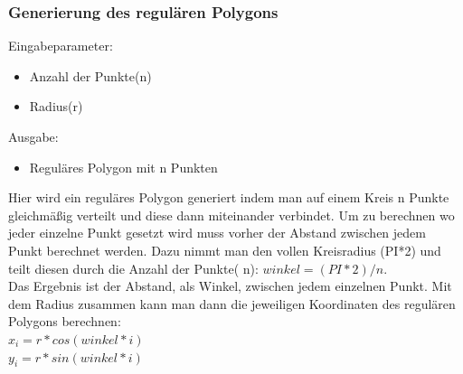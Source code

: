   \subsubsection{Generierung des regulären Polygons}
    Eingabeparameter: 
    \begin{itemize}
      \item Anzahl der Punkte(n)
      \item Radius(r)
    \end{itemize}
    Ausgabe:
    \begin{itemize} 
      \item Reguläres Polygon mit n Punkten
    \end{itemize}
    Hier wird ein reguläres Polygon generiert indem man auf einem Kreis n 
    Punkte gleichmäßig verteilt und diese dann miteinander verbindet. Um 
    zu berechnen wo jeder einzelne Punkt gesetzt wird muss vorher der 
    Abstand zwischen jedem Punkt berechnet werden. Dazu nimmt man den 
    vollen Kreisradius (PI*2) und teilt diesen durch die Anzahl der Punkte(
    n): $winkel = (PI * 2) / n$.\\ 
    Das Ergebnis ist der Abstand, als Winkel, zwischen jedem einzelnen 
    Punkt.
    Mit dem Radius zusammen kann man dann die jeweiligen Koordinaten des 
    regulären Polygons berechnen:\\
    $x_i = r * cos(winkel * i)$\\
    $y_i = r * sin(winkel * i)$

